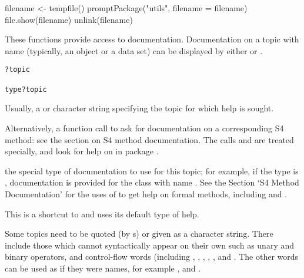 %
\begin{Examples}
\begin{ExampleCode}

filename <- tempfile()
promptPackage("utils", filename = filename)
file.show(filename)
unlink(filename)
\end{ExampleCode}
\end{Examples}
%
\begin{Description}\relax
These functions provide access to documentation.
Documentation on a topic with name  (typically, an \R{}
object or a data set) can be displayed by either  or
.
\end{Description}
%
\begin{Usage}
\begin{verbatim}
?topic

type?topic
\end{verbatim}
\end{Usage}
%
\begin{Arguments}
\begin{ldescription}
\item[\code{topic}] Usually, a  or character string specifying the
topic for which help is sought.

Alternatively, a function call to ask for documentation on a
corresponding S4 method: see the section on S4 method documentation.
The calls  and
 are treated specially, and look for
help on  in package .

\item[\code{type}] the special type of documentation to use for this topic;
for example, if the type is , documentation is
provided for the class with name .
See the Section `S4 Method Documentation' for the uses of
 to get help on formal methods, including
 and .

\end{ldescription}
\end{Arguments}
%
\begin{Details}\relax
This is a shortcut to  and uses its default type of help.

Some topics need to be quoted (by s) or given as a
character string.  There include those which cannot syntactically
appear on their own such as unary and binary operators,
 and control-flow  words (including
,  , , ,
,  and .  The other 
words can be used as if they were names, for example ,
 and .
\end{Details}
